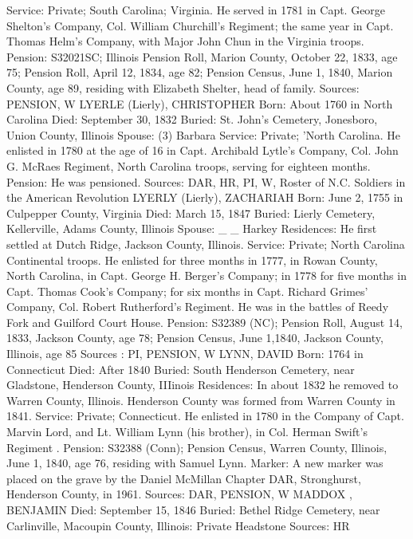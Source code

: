 Service: Private; South Carolina; Virginia. He served in 1781 in Capt. George Shelton's Company, Col. William Churchill's Regiment; the same year in Capt. Thomas Helm's Company, with Major John Chun in the Virginia troops.
Pension: S32021SC; Illinois Pension Roll, Marion County, October 22, 1833, age 75; Pension Roll, April 12, 1834, age 82; Pension Census, June 1, 1840, Marion County, age 89, residing with Elizabeth Shelter, head of family.
Sources: PENSION, W 
LYERLE (Lierly), CHRISTOPHER
Born: About 1760 in North Carolina
Died: September 30, 1832
Buried: St. John's Cemetery, Jonesboro, Union County, Illinois
Spouse: (3) Barbara
Service: Private; 'North Carolina. He enlisted in 1780 at the age of 16 in Capt. Archibald Lytle's Company, Col. John G. McRaes Regiment, North Carolina troops, serving for eighteen months.
Pension: He was pensioned.
Sources: DAR, HR, PI, W, Roster of N.C. Soldiers in the American Revolution 
LYERLY (Lierly), ZACHARIAH 
Born: June 2, 1755 in Culpepper County, Virginia 
Died: March 15, 1847 
Buried: Lierly Cemetery, Kellerville, Adams County, Illinois 
Spouse: _ _ Harkey 
Residences: He first settled at Dutch Ridge, Jackson County, Illinois. 
Service: Private; North Carolina Continental troops. He enlisted for three months in 1777, in Rowan County, North Carolina, in Capt. George H. Berger's Company; in 1778 for five months in Capt. Thomas Cook's Company; for six months in Capt. Richard Grimes' Company, Col. Robert Rutherford's Regi­ment.  He was in the battles of Reedy Fork and Guilford Court House. 
Pension: S32389 (NC); Pension Roll, August 14, 1833, Jackson County, age 78; Pension Census, June 1,1840, Jackson County, Illinois, age 85 Sources : PI, PENSION, W 
LYNN, DAVID 
Born: 1764 in Connecticut
Died: After 1840
Buried: South Henderson Cemetery, near Gladstone, Henderson County, IIIinois 
Residences: In about 1832 he removed to Warren County, Illinois. Henderson County was formed from Warren County in 1841.
Service: Private; Connecticut. He enlisted in 1780 in the Company of Capt. Marvin Lord, and Lt. William Lynn (his brother), in Col. Herman Swift's Regiment .
Pension: S32388 (Conn); Pension Census, Warren County, Illinois, June 1, 1840, age 76, residing with Samuel Lynn.
Marker: A new marker was placed on the grave by the Daniel McMillan Chapter DAR, Stronghurst, Henderson County, in 1961.
Sources: DAR, PENSION, W 
MADDOX , BENJAMIN 
Died: September 15, 1846
Buried: Bethel Ridge Cemetery, near Carlinville, Macoupin County, Illinois: Private Headstone
Sources: HR 

